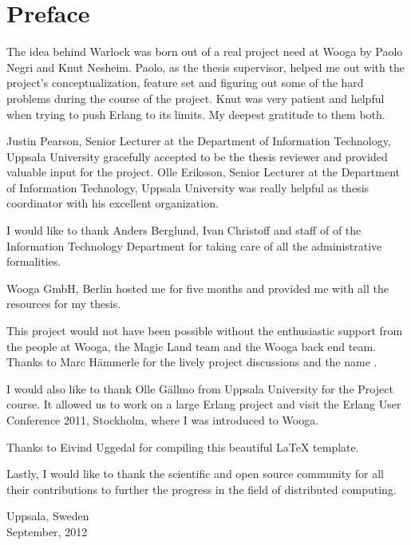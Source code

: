 \chapter{Preface}

The idea behind Warlock was born out of a real project need at Wooga by
Paolo Negri and Knut Nesheim. Paolo, as the thesis supervisor, helped
me out with the project's conceptualization, feature set and figuring
out some of the hard problems during the course of the project.
Knut was very patient and helpful when trying to push Erlang to its
limits. My deepest gratitude to them both.

Justin Pearson, Senior Lecturer at the Department of Information Technology,
Uppsala University gracefully accepted to be the thesis reviewer and provided
valuable input for the project. Olle Eriksson, Senior Lecturer at the Department
of Information Technology, Uppsala University was really helpful as thesis
coordinator with his excellent organization.

I would like to thank Anders Berglund, Ivan Christoff and staff of
of the Information Technology Department for taking care of all the
administrative formalities.

Wooga GmbH, Berlin hosted me for five months and provided me with all the
resources for my thesis.

This project would not have been possible without the enthusiastic support from
the people at Wooga, the Magic Land team and the Wooga back end team. Thanks to
Marc Hämmerle for the lively project discussions and the name .

I would also like to thank Olle Gällmo from Uppsala University for the
Project  course. It allowed us to work on a large Erlang project and
visit the Erlang User Conference 2011, Stockholm, where I was
introduced to Wooga.

Thanks to Eivind Uggedal for compiling this beautiful {\LaTeX} template.

Lastly, I would like to thank the scientific and open
source community for all their contributions to further the progress in the
field of distributed computing.\\

{\par}

{\raggedright{Uppsala, Sweden \\ September, 2012}\par}

